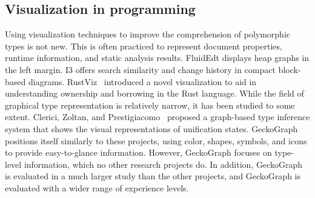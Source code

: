 

\subsection{Visualization in programming}
Using visualization techniques to improve the comprehension of polymorphic types is not new. This is often practiced to represent document properties, runtime information, and static analysis results.  FluidEdt \cite{Ou2015-vr} displays heap graphs in the left margin. I3 \cite{Beck2015-my} offers search similarity and change history in compact block-based diagrams. RustViz~\cite{Almeida2022-bv} introduced a novel visualization to aid in understanding ownership and borrowing in the Rust language. While the field of graphical type representation is relatively narrow, it has been studied to some extent. Clerici, Zoltan, and Prestigiacomo~\cite{Clerici2013-ru} proposed a graph-based type inference system that shows the visual representations of unification states. GeckoGraph positions itself similarly to these projects, using color, shapes, symbols, and icons to provide easy-to-glance information. However, GeckoGraph focuses on type-level information, which no other research projects do. In addition, GeckoGraph is evaluated in a much larger study than the other projects, and GeckoGraph is evaluated with a wider range of experience levels. 

